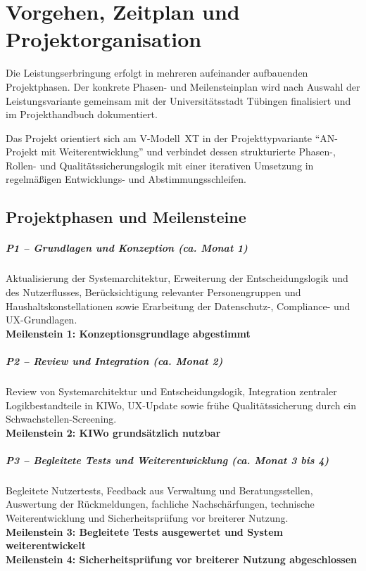 \chapter{Vorgehen, Zeitplan und Projektorganisation}

Die Leistungserbringung erfolgt in mehreren aufeinander aufbauenden
Projektphasen. Der konkrete Phasen- und Meilensteinplan wird nach Auswahl
der Leistungsvariante gemeinsam mit der Universitätsstadt Tübingen
finalisiert und im Projekthandbuch dokumentiert.

Das Projekt orientiert sich am V-Modell~XT in der Projekttypvariante
\enquote{AN-Projekt mit Weiterentwicklung} und verbindet dessen strukturierte
Phasen-, Rollen- und Qualitätssicherungslogik mit einer iterativen Umsetzung
in regelmäßigen Entwicklungs- und Abstimmungsschleifen.

\section{Projektphasen und Meilensteine}

\paragraph{P1 -- Grundlagen und Konzeption (ca. Monat 1)}
Aktualisierung der Systemarchitektur, Erweiterung der Entscheidungslogik und
des Nutzerflusses, Berücksichtigung relevanter Personengruppen und
Haushaltskonstellationen sowie Erarbeitung der Datenschutz-, Compliance-
und UX-Grundlagen.\\
\textbf{Meilenstein 1: Konzeptionsgrundlage abgestimmt}

\paragraph{P2 -- Review und Integration (ca. Monat 2)}
Review von Systemarchitektur und Entscheidungslogik, Integration zentraler
Logikbestandteile in KIWo, UX-Update sowie frühe Qualitätssicherung durch
ein Schwachstellen-Screening.\\
\textbf{Meilenstein 2: KIWo grundsätzlich nutzbar}

\paragraph{P3 -- Begleitete Tests und Weiterentwicklung (ca. Monat 3 bis 4)}
Begleitete Nutzertests, Feedback aus Verwaltung und Beratungsstellen,
Auswertung der Rückmeldungen, fachliche Nachschärfungen, technische
Weiterentwicklung und Sicherheitsprüfung vor breiterer Nutzung.\\
\textbf{Meilenstein 3: Begleitete Tests ausgewertet und System weiterentwickelt}\\
\textbf{Meilenstein 4: Sicherheitsprüfung vor breiterer Nutzung abgeschlossen}

